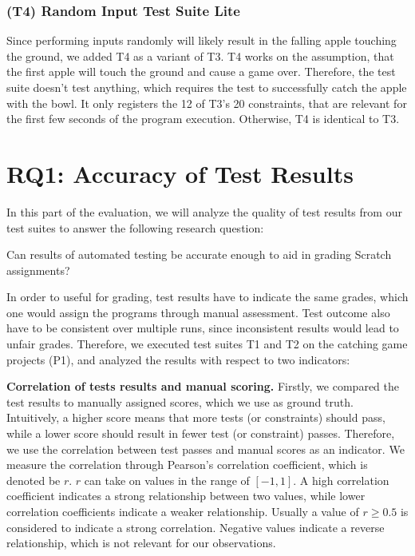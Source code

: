 \subsubsection{(T4) Random Input Test Suite Lite}

Since performing inputs randomly will likely result in the falling apple touching the ground,
we added T4 as a variant of T3.
T4 works on the assumption, that the first apple will touch the ground and cause a game over.
Therefore, the test suite doesn't test anything, which requires the test to successfully catch the apple with the bowl.
It only registers the 12 of T3's 20 constraints, that are relevant for the first few seconds of the program execution.
Otherwise, T4 is identical to T3.

\section{RQ1: Accuracy of Test Results}

In this part of the evaluation, we will analyze the quality of test results from our test suites to answer the following research question:

\begin{center}\begin{minipage}{.9\textwidth}
Can results of automated testing be accurate enough to aid in grading Scratch assignments?
\end{minipage}\end{center}

\noindent In order to useful for grading,
test results have to indicate the same grades,
which one would assign the programs through manual assessment.
Test outcome also have to be consistent over multiple runs,
since inconsistent results would lead to unfair grades.
Therefore, we executed test suites T1 and T2 on the catching game projects (P1),
and analyzed the results with respect to two indicators:
\parspace

\textbf{Correlation of tests results and manual scoring.}
Firstly, we compared the test results to manually assigned scores, which we use as ground truth.
Intuitively, a higher score means that more tests (or constraints) should pass,
while a lower score should result in fewer test (or constraint) passes.
Therefore, we use the correlation between test passes and manual scores as an indicator.
We measure the correlation through Pearson's correlation coefficient, which is denoted be $r$.
$r$ can take on values in the range of $[-1, 1]$.
A high correlation coefficient indicates a strong relationship between two values,
while lower correlation coefficients indicate a weaker relationship.
Usually a value of $r \ge 0.5$ is considered to indicate a strong correlation.
Negative values indicate a reverse relationship, which is not relevant for our observations.
\parspace

